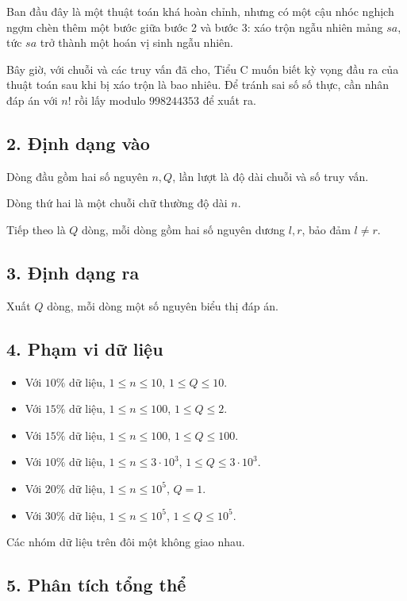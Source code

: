 \documentclass[11pt]{article}
\begin{document}
Ban đầu đây là một thuật toán khá hoàn chỉnh, nhưng có một cậu nhóc nghịch
ngợm chèn thêm một bước giữa bước 2 và bước 3: xáo trộn ngẫu nhiên mảng
\(sa\), tức \(sa\) trở thành một hoán vị sinh ngẫu nhiên.

Bây giờ, với chuỗi và các truy vấn đã cho, Tiểu C muốn biết kỳ vọng đầu ra của
thuật toán sau khi bị xáo trộn là bao nhiêu. Để tránh sai số số thực, cần nhân
đáp án với \(n!\) rồi lấy modulo \(998244353\) để xuất ra.

\subsection*{2. Định dạng vào}

Dòng đầu gồm hai số nguyên \(n,Q\), lần lượt là độ dài chuỗi và số truy vấn.

Dòng thứ hai là một chuỗi chữ thường độ dài \(n\).

Tiếp theo là \(Q\) dòng, mỗi dòng gồm hai số nguyên dương \(l,r\), bảo đảm
\(l\ne r\).

\subsection*{3. Định dạng ra}

Xuất \(Q\) dòng, mỗi dòng một số nguyên biểu thị đáp án.

\subsection*{4. Phạm vi dữ liệu}

\begin{itemize}
  \item Với \(10\%\) dữ liệu, \(1\le n\le 10\), \(1\le Q\le 10\).
  \item Với \(15\%\) dữ liệu, \(1\le n\le 100\), \(1\le Q\le 2\).
  \item Với \(15\%\) dữ liệu, \(1\le n\le 100\), \(1\le Q\le 100\).
  \item Với \(10\%\) dữ liệu, \(1\le n\le 3\cdot 10^3\),
  \(1\le Q\le 3\cdot 10^3\).
  \item Với \(20\%\) dữ liệu, \(1\le n\le 10^5\), \(Q=1\).
  \item Với \(30\%\) dữ liệu, \(1\le n\le 10^5\), \(1\le Q\le 10^5\).
\end{itemize}

Các nhóm dữ liệu trên đôi một không giao nhau.

\subsection*{5. Phân tích tổng thể}
\end{document}
